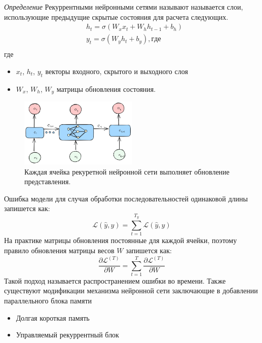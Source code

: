 \textit{Определение} Рекуррентными нейронными сетями называют
называется слои, использующие предыдущие скрытые состояния для расчета следующих.
\begin{equation}
    \begin{aligned}
        & h_t = \sigma (W_x x_t + W_h h_{t-1}+ b_h) \\
        & y_t = \sigma (W_y h_t + b_y), где \\
    \end{aligned}
\end{equation}
где \begin{itemize}
    \item $x_t$, $h_t$, $y_t$ векторы входного, скрытого и выходного слоя
    \item $W_x$, $W_h$, $W_y$ матрицы обновления состояния.
\end{itemize}
\begin{figure}[h]
    \centering
    \includegraphics[width=0.5\textwidth]{assets/ml/nn/rnn.excalidraw.png}
    \caption{Каждая ячейка рекуретной нейронной сети выполняет обновление представления.}
    \label{reccurent}
\end{figure}
Ошибка модели для случая обработки последовательностей 
одинаковой длины запишется как:
\begin{equation}
    \mathcal{L}(\hat{y},y) = \sum_{t=1}^{T_y} \mathcal{L}(\hat{y},y)
\end{equation}
На практике матрицы обновления постоянные для каждой ячейки, поэтому
правило обновления матрицы весов $W$ запишется как:
\begin{equation}
    \frac{\partial \mathcal{L}^{(T)}}{\partial W} = \sum_{t=1}^T \frac{\partial \mathcal{L}^{(T)} }{\partial W}
\end{equation}
Такой подход называется распространением ошибки во времени. 
Также существуют модификации механизма нейронной сети
заключающие в добавлении параллельного блока памяти \begin{itemize}
    \item Долгая короткая память \cite{ochreiter1997long}
    \item Управляемый рекуррентный блок \cite{chung2014empirical}
\end{itemize}

